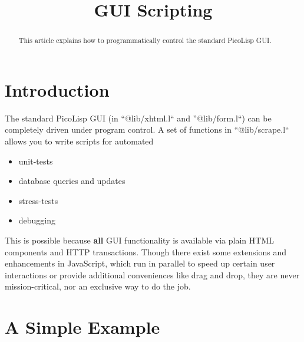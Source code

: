 \title{GUI Scripting}

\maketitle






\begin{abstract}
  This article explains how to programmatically control the standard PicoLisp GUI.
\end{abstract}

\section{Introduction}
\label{sec:gui-script-introduction}

The standard PicoLisp GUI (in ``@lib/xhtml.l`` and ''@lib/form.l``) can be
completely driven under program control. A set of functions in ``@lib/scrape.l``
allows you to write scripts for automated
\begin{itemize}
   \item unit-tests
   \item database queries and updates
   \item stress-tests
   \item debugging
\end{itemize}
This is possible because \textbf{all} GUI functionality is available via plain HTML
components and HTTP transactions. Though there exist some extensions and
enhancements in JavaScript, which run in parallel to speed up certain user
interactions or provide additional conveniences like drag and drop, they are
never mission-critical, nor an exclusive way to do the job.

\section{A Simple Example}
\label{sec:gui-script-a-simple-example}

